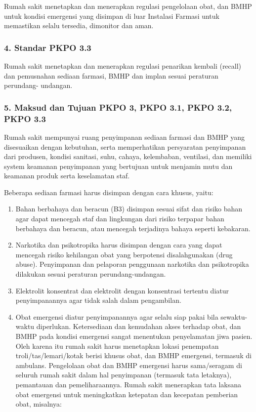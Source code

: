 \documentclass[
]{book}
\providecommand{\tightlist}{%
  \setlength{\itemsep}{0pt}\setlength{\parskip}{0pt}}
\begin{document}
Rumah sakit menetapkan dan menerapkan regulasi pengelolaan obat, dan BMHP untuk kondisi emergensi yang disimpan di luar Instalasi Farmasi untuk memastikan selalu tersedia, dimonitor dan aman.

\hypertarget{standar-pkpo-3.3}{%
\subsubsection*{4. Standar PKPO 3.3}\label{standar-pkpo-3.3}}

Rumah sakit menetapkan dan menerapkan regulasi penarikan kembali (recall) dan pemusnahan sediaan farmasi, BMHP dan implan sesuai peraturan perundang- undangan.

\hypertarget{maksud-dan-tujuan-pkpo-3-pkpo-3.1-pkpo-3.2-pkpo-3.3}{%
\subsubsection*{5. Maksud dan Tujuan PKPO 3, PKPO 3.1, PKPO 3.2, PKPO 3.3}\label{maksud-dan-tujuan-pkpo-3-pkpo-3.1-pkpo-3.2-pkpo-3.3}}

Rumah sakit mempunyai ruang penyimpanan sediaan farmasi dan BMHP yang disesuaikan dengan kebutuhan, serta memperhatikan persyaratan penyimpanan dari produsen, kondisi sanitasi, suhu, cahaya, kelembaban, ventilasi, dan memiliki system keamanan penyimpanan yang bertujuan untuk menjamin mutu dan keamanan produk serta keselamatan staf.

Beberapa sediaan farmasi harus disimpan dengan cara khusus, yaitu:

\begin{enumerate}
\def\labelenumi{\alph{enumi}.}
\tightlist
\item
  Bahan berbahaya dan beracun (B3) disimpan sesuai sifat dan risiko bahan agar dapat mencegah staf dan lingkungan dari risiko terpapar bahan berbahaya dan beracun, atau mencegah terjadinya bahaya seperti kebakaran.
\item
  Narkotika dan psikotropika harus disimpan dengan cara yang dapat mencegah risiko kehilangan obat yang berpotensi disalahgunakan (drug abuse). Penyimpanan dan pelaporan penggunaan narkotika dan psikotropika dilakukan sesuai peraturan perundang-undangan.
\item
  Elektrolit konsentrat dan elektrolit dengan konsentrasi tertentu diatur penyimpanannya agar tidak salah dalam pengambilan.
\item
  Obat emergensi diatur penyimpanannya agar selalu siap pakai bila sewaktu-waktu diperlukan. Ketersediaan dan kemudahan akses terhadap obat, dan BMHP pada kondisi emergensi sangat menentukan penyelamatan jiwa pasien. Oleh karena itu rumah sakit harus menetapkan lokasi penempatan troli/tas/lemari/kotak berisi khusus obat, dan BMHP emergensi, termasuk di ambulans. Pengelolaan obat dan BMHP emergensi harus sama/seragam di seluruh rumah sakit dalam hal penyimpanan (termasuk tata letaknya), pemantauan dan pemeliharaannya. Rumah sakit menerapkan tata laksana obat emergensi untuk meningkatkan ketepatan dan kecepatan pemberian obat, misalnya:
\end{enumerate}
\end{document}
